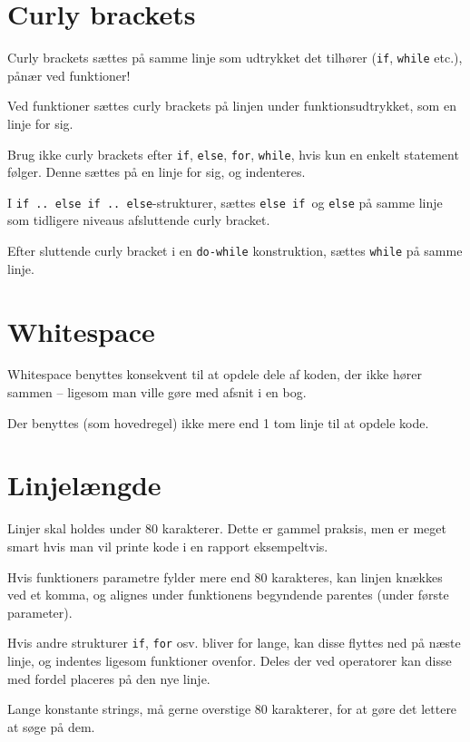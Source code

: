 \documentclass[article, 10pt]{memoir}
\let\tempone\itemize
\let\temptwo\enditemize
\renewenvironment{itemize}{\tempone\firmlist}{\temptwo}
\begin{document}
\begin{multicols}{2}
    \section{Curly brackets}
    \begin{itemize}
    \item Curly brackets sættes på samme linje som udtrykket det tilhører (\texttt{if}, \texttt{while} etc.), pånær ved funktioner!
    \item Ved funktioner sættes curly brackets på linjen under funktionsudtrykket, som en linje for sig.
    \item Brug ikke curly brackets efter \texttt{if}, \texttt{else}, \texttt{for}, \texttt{while}, hvis kun en enkelt statement følger. Denne sættes på en linje for sig, og indenteres.
    \item I \texttt{if .. else if .. else}-strukturer, sættes \texttt{else if }og \texttt{else} på samme linje som tidligere niveaus afsluttende curly bracket.
    \item Efter sluttende curly bracket i en \texttt{do-while} konstruktion, sættes \texttt{while} på samme linje.
    \end{itemize}

    \section{Whitespace}
    \begin{itemize}
    \item Whitespace benyttes konsekvent til at opdele dele af koden, der ikke hører sammen -- ligesom man ville gøre med afsnit i en bog.
    \item Der benyttes (som hovedregel) ikke mere end 1 tom linje til at opdele kode.
    \end{itemize}

    \section{Linjelængde}
    \begin{itemize}
    \item Linjer skal holdes under 80 karakterer. Dette er gammel praksis, men er meget smart hvis man vil printe kode i en rapport eksempeltvis.
    \item Hvis funktioners parametre fylder mere end 80 karakteres, kan linjen knækkes ved et komma, og alignes under funktionens begyndende parentes (under første parameter).
    \item Hvis andre strukturer \texttt{if}, \texttt{for} osv. bliver for lange, kan disse flyttes ned på næste linje, og indentes ligesom funktioner ovenfor. Deles der ved operatorer kan disse med fordel placeres på den nye linje.
    \item Lange konstante strings, må gerne overstige 80 karakterer, for at gøre det lettere at søge på dem.
    \end{itemize}


\end{multicols}
\end{document}
